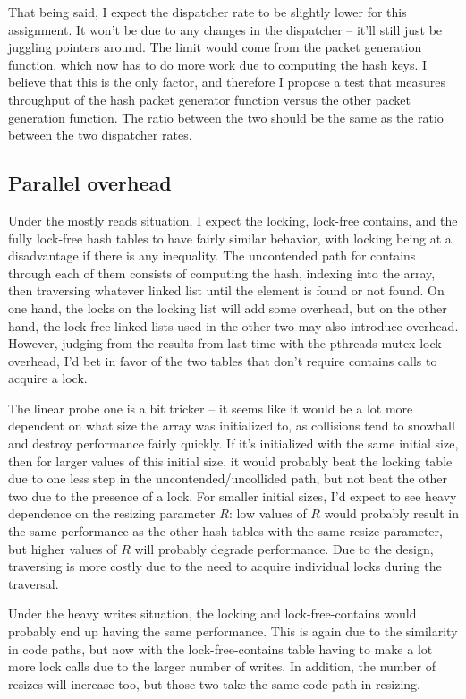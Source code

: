 \documentclass{article}
\begin{document}
That being said, I expect the dispatcher rate to be slightly lower for this assignment. It won't be due to any changes in the dispatcher -- it'll still just be juggling pointers around. The limit would come from the packet generation function, which now has to do more work due to computing the hash keys. I believe that this is the only factor, and therefore I propose a test that measures throughput of the hash packet generator function versus the other packet generation function. The ratio between the two should be the same as the ratio between the two dispatcher rates.
\subsection*{Parallel overhead}
Under the mostly reads situation, I expect the locking, lock-free contains, and the fully lock-free hash tables to have fairly similar behavior, with locking being at a disadvantage if there is any inequality. The uncontended path for contains through each of them consists of computing the hash, indexing into the array, then traversing whatever linked list until the element is found or not found. On one hand, the locks on the locking list will add some overhead, but on the other hand, the lock-free linked lists used in the other two may also introduce overhead. However, judging from the results from last time with the pthreads mutex lock overhead, I'd bet in favor of the two tables that don't require contains calls to acquire a lock.

The linear probe one is a bit tricker -- it seems like it would be a lot more dependent on what size the array was initialized to, as collisions tend to snowball and destroy performance fairly quickly. If it's initialized with the same initial size, then for larger values of this initial size, it would probably beat the locking table due to one less step in the uncontended/uncollided path, but not beat the other two due to the presence of a lock. For smaller initial sizes, I'd expect to see heavy dependence on the resizing parameter $R$: low values of $R$ would probably result in the same performance as the other hash tables with the same resize parameter, but higher values of $R$ will probably degrade performance. Due to the design, traversing is more costly due to the need to acquire individual locks during the traversal.

Under the heavy writes situation, the locking and lock-free-contains would probably end up having the same performance. This is again due to the similarity in code paths, but now with the lock-free-contains table having to make a lot more lock calls due to the larger number of writes. In addition, the number of resizes will increase too, but those two take the same code path in resizing.
\end{document}
